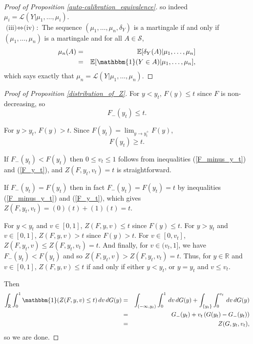 \documentclass[aap]{imsart}
\theoremstyle{plain}
\theoremstyle{definition}
\begin{document}
\begin{appendix}
\begin{proof}[Proof of Proposition \ref{auto-calibration_equivalence}]
  so indeed $\mu_i = \mathcal{L}(Y|\mu_1, \ldots, \mu_i)$. \\
  $\text{(iii)} \Leftrightarrow \text{(iv)}$:\, The sequence $(\mu_1, \ldots, \mu_n, \delta_Y)$ is a martingale if and only if $(\mu_1, \ldots, \mu_n)$ is a martingale and for all $A \in \mathcal{S}$,
\begin{eqnarray*}
  \mu_n(A) & = & \mathbb{E}[\delta_Y(A)|\mu_1,\ldots,\mu_n] \\
           & = & \mathbb{E}[\mathbbm{1}(Y \in A)|\mu_1,\ldots,\mu_n],
\end{eqnarray*}
which says exactly that $\mu_n = \mathcal{L}(Y|\mu_1,\ldots,\mu_n)$.
\end{proof}

\begin{proof}[Proof of Proposition \ref{distribution_of_Z}]
  For $y < y_t$, $F(y) \leq t$ since $F$ is non-decreasing, so
\begin{equation}\label{F_minus_y_t}
  F_-(y_t) \leq t.
\end{equation}

  For $y > y_t$, $F(y) > t$. Since $F(y_t) = \lim_{y \to y_t^+} F(y)$,
\begin{equation}\label{F_y_t}
  F(y_t) \geq t.
\end{equation}

  If $F_-(y_t) < F(y_t)$ then $0 \leq v_t \leq 1$ follows from inequalities (\ref{F_minus_y_t}) and (\ref{F_y_t}), and $Z(F, y_t, v_t) = t$ is straightforward.

  If $F_-(y_t) = F(y_t)$ then in fact $F_-(y_t) = F(y_t) = t$ by inequalities (\ref{F_minus_y_t}) and (\ref{F_y_t}), which gives $Z(F, y_t, v_t) = (0)(t) + (1)(t) = t$.

  For $y < y_t$ and $v \in [0,1]$, $Z(F, y, v) \leq t$ since $F(y) \leq t$. For $y > y_t$ and $v \in [0,1]$, $Z(F, y, v) > t$ since $F(y) > t$. For $v \in [0,v_t]$, $Z(F, y_t, v) \leq Z(F, y_t, v_t) = t$. And finally, for $v \in (v_t,1]$, we have $F_-(y_t) < F(y_t)$ and so $Z(F, y_t, v) > Z(F, y_t, v_t) = t$. Thus, for $y \in \mathbb{R}$ and $v \in [0,1]$, $Z(F, y, v) \leq t$ if and only if either $y < y_t$, or $y = y_t$ and $v \leq v_t$.

  Then
\begin{eqnarray*}
  \int_\mathbb{R} \int_0^1 \mathbbm{1}(Z(F, y, v) \leq t) \,dv \,dG(y) & = & \int_{(-\infty, y_t)} \int_0^1 \,dv \,dG(y) + \int_{\{y_t\}} \int_0^{v_t} \,dv \,dG(y) \\
                                                                       & = & G_-(y_t) + v_t \left(G(y_t) - G_-(y_t)\right) \\
                                                                       & = & Z(G, y_t, v_t),
\end{eqnarray*}
so we are done.
\end{proof}


\end{appendix}
\end{document}

